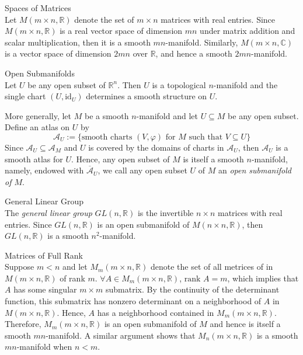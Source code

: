 \begin{example}{Spaces of Matrices}\\
Let $M(m \times n, \mathbb{R})$ denote the set of $m\times n$ matrices with real entries. Since $M(m\times n,\mathbb{R})$ is a real vector space of dimension $mn$ under matrix addition and scalar multiplication, then it is a smooth $mn$-manifold. Similarly, $M(m \times n,\mathbb{C})$ is a vector space of dimension $2mn$ over $\mathbb{R}$, and hence a smooth $2mn$-manifold.
\end{example}

\begin{example}{Open Submanifolds}\\
Let $U$ be any open subset of $\mathbb{R}^n$. Then $U$ is a topological $n$-manifold and the single chart $(U, \text{id}_U)$ determines a smooth structure on $U$. 

More generally, let $M$ be a smooth $n$-manifold and let $U\subseteq M$ be any open subset. Define an atlas on $U$ by
\[
\mathcal{A}_U:= \{ \text{smooth charts } (V,\varphi) \text{ for } M\text{ such that } V\subseteq U\}
\]
Since $\mathcal{A}_U \subseteq \mathcal{A}_M$ and $U$ is covered by the domains of charts in $\mathcal{A}_U$, then $\mathcal{A}_U$ is a smooth atlas for $U$. Hence, any open subset of $M$ is itself a smooth $n$-manifold, namely, endowed with $\overline{\mathcal{A}}_U$, we call any open subset $U$ of $M$ an \textit{open submanifold of $M$}.
\end{example}

\begin{example}{General Linear Group}\\
The \textit{general linear group} $GL(n,\mathbb{R})$ is the invertible $n\times n$ matrices with real entries. Since $GL(n, \mathbb{R})$ is an open submanifold of $M(n \times n,\mathbb{R})$, then $GL(n,\mathbb{R})$ is a smooth $n^2$-manifold.
\end{example}

\begin{example}{Matrices of Full Rank}\\
Suppose $m<n$ and let $M_m(m\times n,\mathbb{R})$ denote the set of all metrices of in $M(m \times n,\mathbb{R})$ of rank $m$. $\forall A\in M_m(m\times n,\mathbb{R})$, $\text{rank }A=m$, which implies that $A$ has some singular $m\times m$ submatrix. By the continuity of the determinant function, this submatrix has nonzero determinant on a neighborhood of $A$ in $M(m \times n,\mathbb{R})$. Hence, $A$ has a neighborhood contained in $M_m(m \times n, \mathbb{R})$. Therefore, $M_m(m \times n,\mathbb{R})$ is an open submanifold of $M$ and hence is itself a smooth $mn$-manifold. A similar argument shows that $M_n(m \times n,\mathbb{R})$ is a smooth $mn$-manifold when $n<m$.
\end{example}

